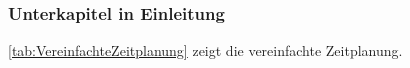 ﻿\subsubsection{Unterkapitel in Einleitung}
\label{subsec:Unterkapitel_in_Einleitung}


\autoref{tab:VereinfachteZeitplanung} zeigt die vereinfachte Zeitplanung.